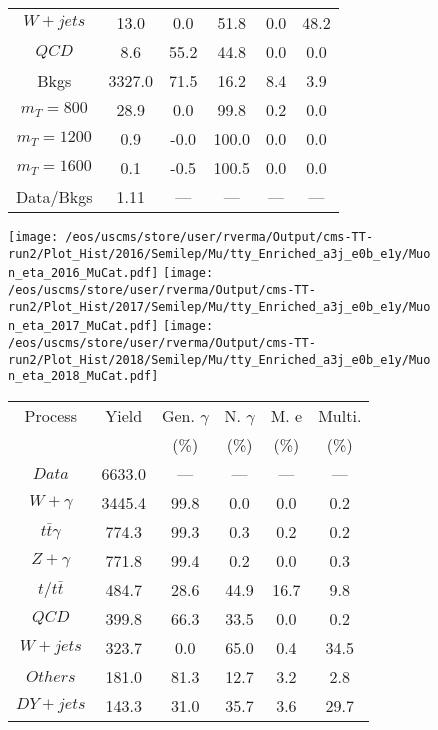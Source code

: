 \begin{figure}
\begin{minipage}[c]{0.32\textwidth}
{\begin{tabular}{cccccc}
$ W+jets $ &  13.0 &  0.0 &  51.8 &  0.0 &  48.2\\
$ QCD $ &  8.6 &  55.2 &  44.8 &  0.0 &  0.0\\
Bkgs &  3327.0 &  71.5 &  16.2 &  8.4 &  3.9\\
$ m_{T} = 800 $ &  28.9 &  0.0 &  99.8 &  0.2 &  0.0\\
$ m_{T} = 1200 $ &  0.9 &  -0.0 &  100.0 &  0.0 &  0.0\\
$ m_{T} = 1600 $ &  0.1 &  -0.5 &  100.5 &  0.0 &  0.0\\
Data/Bkgs &  1.11 &  --- &  --- &  --- &  ---\\
\hline
\end{tabular}
}
\end{minipage}
\end{figure}

\begin{figure}
\centering
\texttt{[image: /eos/uscms/store/user/rverma/Output/cms-TT-run2/Plot\_Hist/2016/Semilep/Mu/tty\_Enriched\_a3j\_e0b\_e1y/Muon\_eta\_2016\_MuCat.pdf]}
\texttt{[image: /eos/uscms/store/user/rverma/Output/cms-TT-run2/Plot\_Hist/2017/Semilep/Mu/tty\_Enriched\_a3j\_e0b\_e1y/Muon\_eta\_2017\_MuCat.pdf]}
\texttt{[image: /eos/uscms/store/user/rverma/Output/cms-TT-run2/Plot\_Hist/2018/Semilep/Mu/tty\_Enriched\_a3j\_e0b\_e1y/Muon\_eta\_2018\_MuCat.pdf]}
\begin{minipage}[c]{0.32\textwidth}
\centering
\tiny{
\begin{tabular}{cccccc}
\hline
Process & Yield & Gen. $\gamma$ & N. $\gamma$ & M. e & Multi. \\
 &  & (\%) & (\%) & (\%) & (\%)  \\
\hline
                                                                      $ Data $ &  6633.0 &  --- &  --- &  --- &  ---\\
$ W+\gamma $ &  3445.4 &  99.8 &  0.0 &  0.0 &  0.2\\
$ t\bar{t}\gamma $ &  774.3 &  99.3 &  0.3 &  0.2 &  0.2\\
$ Z+\gamma $ &  771.8 &  99.4 &  0.2 &  0.0 &  0.3\\
$ t/t\bar{t} $ &  484.7 &  28.6 &  44.9 &  16.7 &  9.8\\
$ QCD $ &  399.8 &  66.3 &  33.5 &  0.0 &  0.2\\
$ W+jets $ &  323.7 &  0.0 &  65.0 &  0.4 &  34.5\\
$ Others $ &  181.0 &  81.3 &  12.7 &  3.2 &  2.8\\
$ DY+jets $ &  143.3 &  31.0 &  35.7 &  3.6 &  29.7\\

\end{tabular}}
\end{minipage}
\end{figure}
